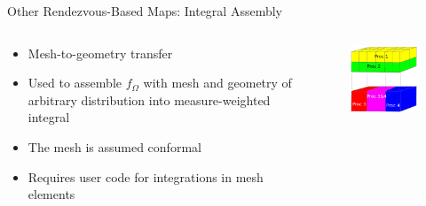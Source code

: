 \documentclass{beamer}
\begin{document}
\begin{frame}{Other Rendezvous-Based Maps: Integral Assembly}

  \begin{columns}
    
    \begin{column}{0.4\textwidth}
      \begin{itemize}
      \item Mesh-to-geometry transfer
        \medskip
      \item Used to assemble $f_{\Omega}$ with mesh and geometry of
        arbitrary distribution into measure-weighted integral
        \medskip
      \item The mesh is assumed conformal
        \medskip
      \item Requires user code for integrations in mesh elements
      \end{itemize}
    \end{column}

    \begin{column}{0.6\textwidth}
      \begin{figure}
      \centering
      \includegraphics[width=2.5in]{integral_assembly.png}
      \end{figure}
    \end{column}

  \end{columns}

\end{frame}
\end{document}
